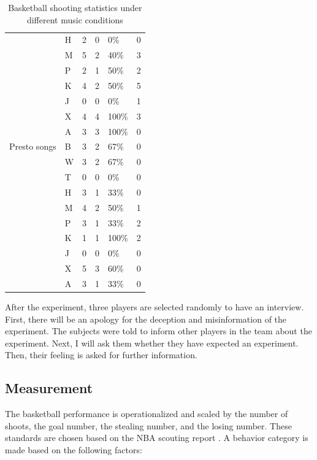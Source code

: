 \documentclass{article}
\begin{document}
\begin{table}[h]
\begin{tabular}{@{}llllll@{}}
                       & H & 2 & 0 & 0\% & 0 \\
                       & M & 5 & 2 & 40\% & 3 \\
                       & P & 2 & 1 & 50\% & 2 \\
                       & K & 4 & 2 & 50\% & 5 \\
                       & J & 0 & 0 & 0\% & 1 \\
                       & X & 4 & 4 & 100\% & 3 \\
                       & A & 3 & 3 & 100\% & 0 \\
        \midrule
        Presto songs & B & 3 & 2 & 67\% & 0 \\
                     & W & 3 & 2 & 67\% & 0 \\
                     & T & 0 & 0 & 0\% & 0 \\
                     & H & 3 & 1 & 33\% & 0 \\
                     & M & 4 & 2 & 50\% & 1 \\
                     & P & 3 & 1 & 33\% & 2 \\
                     & K & 1 & 1 & 100\% & 2 \\
                     & J & 0 & 0 & 0\% & 0 \\
                     & X & 5 & 3 & 60\% & 0 \\
                     & A & 3 & 1 & 33\% & 0 \\
        \bottomrule
    \end{tabular}
    \caption{Basketball shooting statistics under different music conditions}
    \label{basketballtable}
\end{table}

After the experiment, three players are selected randomly to have an interview. First, there will be an apology for the deception and misinformation of the experiment. The subjects were told to inform other players in the team about the experiment. Next, I will ask them whether they have expected an experiment. Then, their feeling is asked for further information.

\subsection{Measurement}
The basketball performance is operationalized and scaled by the number of shoots, the goal number, the stealing number, and the losing number. These standards are chosen based on the NBA scouting report \autocite{NBAZhongGuoGuanFangWangZhanQiuYuanZiLiao2024}. A behavior category is made based on the following factors:
\end{document}
